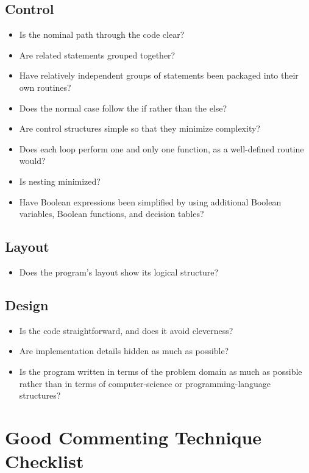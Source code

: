 \subsection{Control}
\begin{itemize}
\item Is the nominal path through the code clear?
\item Are related statements grouped together?
\item Have relatively independent groups of statements been packaged into their own routines?
\item Does the normal case follow the if rather than the else?
\item Are control structures simple so that they minimize complexity?
\item Does each loop perform one and only one function, as a well-defined routine would?
\item Is nesting minimized?
\item Have Boolean expressions been simplified by using additional Boolean variables, Boolean functions, and decision tables?
\end{itemize}

\subsection{Layout}
\begin{itemize}
\item Does the program’s layout show its logical structure?
\end{itemize}

\subsection{Design}
\begin{itemize}
\item Is the code straightforward, and does it avoid cleverness?
\item Are implementation details hidden as much as possible?
\item Is the program written in terms of the problem domain as much as possible rather than in terms of computer-science or programming-language structures?
\end{itemize}

\newpage
\section{Good Commenting Technique Checklist}
